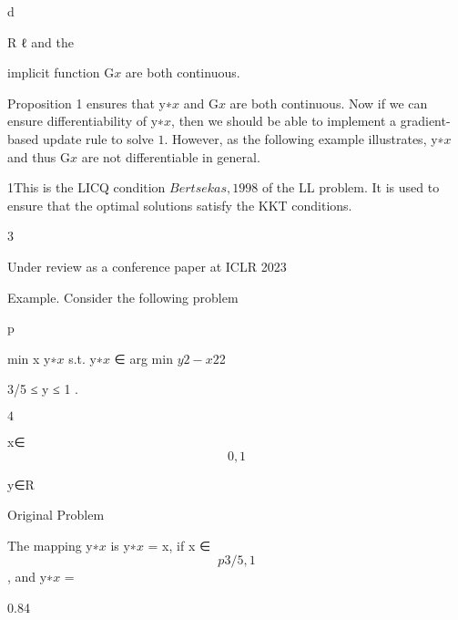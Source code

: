 \documentclass[11pt]{article}
\begin{document}
d

R ℓ and the

implicit function G\(x\) are both continuous.

Proposition 1 ensures that y∗\(x\) and G\(x\) are both continuous. Now if we can ensure differentiability of y∗\(x\), then we should be able to implement a gradient-based update rule to solve \(1\). However, as the following example illustrates, y∗\(x\) and thus G\(x\) are not differentiable in general.

1This is the LICQ condition \(Bertsekas, 1998\) of the LL problem. It is used to ensure that the optimal solutions satisfy the KKT conditions.

3

Under review as a conference paper at ICLR 2023

Example. Consider the following problem

p

min x \+ y∗\(x\) s.t. y∗\(x\) ∈ arg min \(y2 − x2\)2

3/5 ≤ y ≤ 1 .

\(4\)

x∈\[0,1\]

y∈R

Original Problem

The mapping y∗\(x\) is y∗\(x\) = x, if x ∈ \[p3/5, 1\], and y∗\(x\) =

0.84
\end{document}
